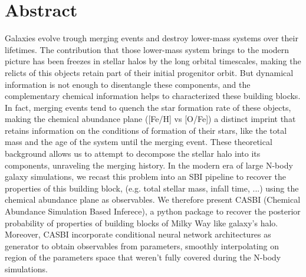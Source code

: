 \chapter{Abstract}
Galaxies evolve trough merging events and destroy lower-mass systems over their lifetimes. The contribution that those lower-mass system brings to 
the modern picture has been freezes in stellar halos by the long orbital timescales, making the relicts of this objects retain part of 
their initial progenitor orbit. But dynamical information is not enough to disentangle these components, and the complementary chemical information 
helps to characterized these building blocks. In fact, merging events tend to quench the star formation rate of these objects, making the chemical 
abundance plane ([Fe/H] vs [O/Fe]) a distinct imprint that retains information on the conditions of formation of their stars, like the total mass and 
the age of the system until the merging event. These theoretical background allows us to attempt to decompose the stellar halo into its components, 
unraveling the merging history. In the modern era of large N-body galaxy simulations, we recast this problem into an SBI pipeline to recover the 
properties of this building block, (e.g. total stellar mass, infall time, ...) using the chemical abundance plane as observables. We therefore present CASBI 
(Chemical Abundance Simulation Based Inferece), a python package to recover the posterior probability of properties of building blocks of Milky Way 
like galaxy's halo. Moreover, CASBI incorporate conditional neural network architectures as generator to obtain observables from parameters, smoothly 
    interpolating on region of the parameters space that weren't fully covered during the N-body simulations.
